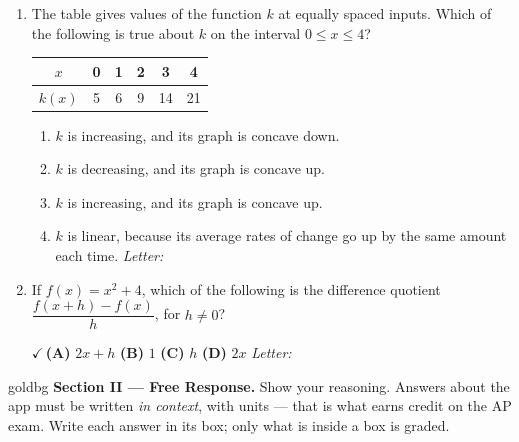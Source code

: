 \documentclass[10pt]{article}
\begin{document}
\begin{enumerate}[leftmargin=1.9em, itemsep=12pt]
\item The table gives values of the function $k$ at equally spaced inputs. Which of the
      following is true about $k$ on the interval $0 \le x \le 4$?

      \smallskip
      \begin{center}
      \renewcommand{\arraystretch}{1.2}
      \begin{tabular}{|c|c|c|c|c|c|}
      \hline
      $x$    & 0 & 1 & 2 & 3  & 4  \\ \hline
      $k(x)$ & 5 & 6 & 9 & 14 & 21 \\ \hline
      \end{tabular}
      \end{center}
      \begin{enumerate}[leftmargin=2.6em, itemsep=2pt]
        \item[(A)] $k$ is increasing, and its graph is concave down.
        \item[(B)] $k$ is decreasing, and its graph is concave up.
        \item[{\color{keyred}$\checkmark$\,(C)}] $k$ is increasing, and its graph is concave up.
        \item[(D)] $k$ is linear, because its average rates of change go up by the same amount each time. \hfill\textit{Letter:}~\gradedblank[id=ap4, type=choice, points=1, answer=C]{0.42in}{13pt}
      \end{enumerate}

\item If $f(x) = x^2 + 4$, which of the following is the difference quotient
      $\dfrac{f(x + h) - f(x)}{h}$, for $h \ne 0$?

      \smallskip
      {\color{keyred}\textbf{$\checkmark$\,(A)}} $2x + h$ \hspace{3em} \textbf{(B)} $1$ \hspace{3em} \textbf{(C)} $h$ \hspace{3em} \textbf{(D)} $2x$ \hfill\textit{Letter:}~\gradedblank[id=ap5, type=choice, points=1, answer=A]{0.42in}{13pt}

\end{enumerate}

\newpage

\begin{headlinebox}{goldbg}
\small
\textbf{Section II --- Free Response.} Show your reasoning. Answers about the app must be
written \emph{in context}, with units --- that is what earns credit on the AP exam. Write each answer in its box; only what is inside a box is graded.
\end{headlinebox}
\end{document}

